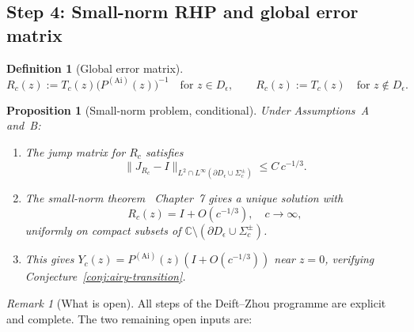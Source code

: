 \documentclass[12pt,a4paper]{amsart}
\newtheorem{proposition}[theorem]{Proposition}
\theoremstyle{definition}
\newtheorem{definition}[theorem]{Definition}
\theoremstyle{remark}
\newtheorem{remark}[theorem]{Remark}
\newcommand{\norm}[1]{\|#1\|}
\begin{document}
\subsection{Step 4: Small-norm RHP and global error matrix}

\begin{definition}[Global error matrix]
\label{def:error-matrix}
\begin{equation}\label{eq:error-matrix}
  R_c(z):=T_c(z)\bigl(P^{(\mathrm{Ai})}(z)\bigr)^{-1}
  \quad\text{for }z\in D_\epsilon,
  \qquad
  R_c(z):=T_c(z)
  \quad\text{for }z\notin D_\epsilon.
\end{equation}
\end{definition}

\begin{proposition}[Small-norm problem, conditional]
\label{prop:small-norm}
Under Assumptions~A and~B:
\begin{enumerate}[label=(\roman*)]
\item The jump matrix for $R_c$ satisfies
  \begin{equation}\label{eq:Rc-jump-bound}
    \norm{J_{R_c}-I}_{L^2\cap L^\infty(\partial D_\epsilon\cup\Sigma_c^\pm)}
    \le C\,c^{-1/3}.
  \end{equation}
\item The small-norm theorem~\cite{Deift1999} Chapter~7 gives a unique
  solution with
  \begin{equation}\label{eq:Rc-norm}
    R_c(z)=I+O(c^{-1/3}),\quad c\to\infty,
  \end{equation}
  uniformly on compact subsets of
  $\mathbb{C}\setminus(\partial D_\epsilon\cup\Sigma_c^\pm)$.
\item This gives $Y_c(z)=P^{(\mathrm{Ai})}(z)(I+O(c^{-1/3}))$
  near $z=0$, verifying Conjecture~\ref{conj:airy-transition}.
\end{enumerate}
\end{proposition}

\begin{remark}[What is open]
\label{rem:what-is-open}
All steps of the Deift--Zhou programme are explicit and complete.
The two remaining open inputs are:

\begin{center}
\end{center}
\end{remark}
\end{document}
